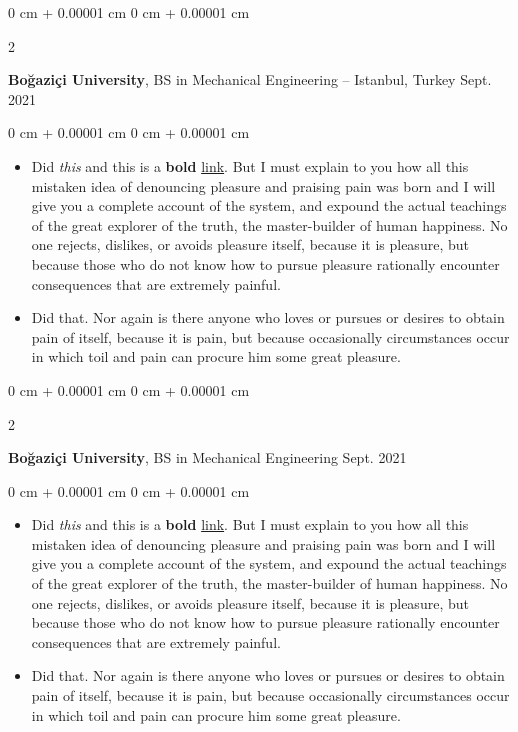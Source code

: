 \documentclass[10pt, letterpaper]{article}
\newenvironment{highlights}{
    \begin{itemize}[
        topsep=0.10 cm,
        parsep=0.10 cm,
        partopsep=0pt,
        itemsep=0pt,
        leftmargin=0 cm + 10pt
    ]
}{
    \end{itemize}
} %
\newenvironment{onecolentry}{
    \begin{adjustwidth}{
        0 cm + 0.00001 cm
    }{
        0 cm + 0.00001 cm
    }
}{
    \end{adjustwidth}
} %
\newenvironment{twocolentry}[2][]{
    \onecolentry
    \def\secondColumn{#2}
    \setcolumnwidth{\fill, 4.5 cm}
    \begin{paracol}{2}
}{
    \switchcolumn \raggedleft \secondColumn
    \end{paracol}
    \endonecolentry
} %
\begin{document}
        \vspace{0.2 cm}

        \begin{twocolentry}{
            Sept. 2021
        }
            \textbf{Boğaziçi University}, BS in Mechanical Engineering -- Istanbul, Turkey\end{twocolentry}

        \vspace{0.10 cm}
        \begin{onecolentry}
            \begin{highlights}
                \item Did \textit{this} and this is a \textbf{bold} \href{https://example.com}{link}. But I must explain to you how all this mistaken idea of denouncing pleasure and praising pain was born and I will give you a complete account of the system, and expound the actual teachings of the great explorer of the truth, the master-builder of human happiness. No one rejects, dislikes, or avoids pleasure itself, because it is pleasure, but because those who do not know how to pursue pleasure rationally encounter consequences that are extremely painful.
                \item Did that. Nor again is there anyone who loves or pursues or desires to obtain pain of itself, because it is pain, but because occasionally circumstances occur in which toil and pain can procure him some great pleasure.
            \end{highlights}
        \end{onecolentry}


        \vspace{0.2 cm}

        \begin{twocolentry}{
            Sept. 2021
        }
            \textbf{Boğaziçi University}, BS in Mechanical Engineering\end{twocolentry}

        \vspace{0.10 cm}
        \begin{onecolentry}
            \begin{highlights}
                \item Did \textit{this} and this is a \textbf{bold} \href{https://example.com}{link}. But I must explain to you how all this mistaken idea of denouncing pleasure and praising pain was born and I will give you a complete account of the system, and expound the actual teachings of the great explorer of the truth, the master-builder of human happiness. No one rejects, dislikes, or avoids pleasure itself, because it is pleasure, but because those who do not know how to pursue pleasure rationally encounter consequences that are extremely painful.
                \item Did that. Nor again is there anyone who loves or pursues or desires to obtain pain of itself, because it is pain, but because occasionally circumstances occur in which toil and pain can procure him some great pleasure.
            \end{highlights}
        \end{onecolentry}
\end{document}
